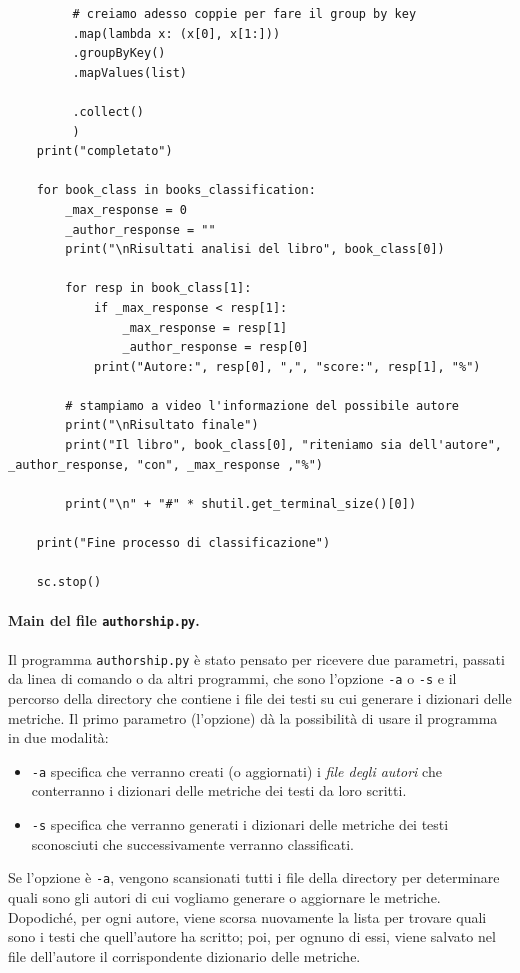 \documentclass[titlepage]{article}
\begin{document}
\begin{verbatim}
         # creiamo adesso coppie per fare il group by key
         .map(lambda x: (x[0], x[1:]))
         .groupByKey()
         .mapValues(list)
         
         .collect()
         )
    print("completato")

    for book_class in books_classification:
        _max_response = 0
        _author_response = ""
        print("\nRisultati analisi del libro", book_class[0])
        
        for resp in book_class[1]:
            if _max_response < resp[1]:
                _max_response = resp[1]
                _author_response = resp[0]
            print("Autore:", resp[0], ",", "score:", resp[1], "%")
        
        # stampiamo a video l'informazione del possibile autore
        print("\nRisultato finale")
        print("Il libro", book_class[0], "riteniamo sia dell'autore", _author_response, "con", _max_response ,"%")
        
        print("\n" + "#" * shutil.get_terminal_size()[0])
    
    print("Fine processo di classificazione")

    sc.stop()

\end{verbatim}

\paragraph{Main del file \texttt{authorship.py}.}
Il programma \texttt{authorship.py} è stato pensato per ricevere due parametri, passati da linea di comando o da altri programmi, che sono l'opzione \texttt{-a} o \texttt{-s} e il percorso della directory che contiene i file dei testi su cui generare i dizionari delle metriche. Il primo parametro (l'opzione) dà la possibilità di usare il programma in due modalità:
\begin{itemize}
    \item \texttt{-a} specifica che verranno creati (o aggiornati) i \textit{file degli autori} che conterranno i dizionari delle metriche dei testi da loro scritti.
    
    \item \texttt{-s} specifica che verranno generati i dizionari delle metriche dei testi sconosciuti che successivamente verranno classificati.
    
\end{itemize}

Se l'opzione è \texttt{-a}, vengono scansionati tutti i file della directory per determinare quali sono gli autori di cui vogliamo generare o aggiornare le metriche. Dopodiché, per ogni autore, viene scorsa nuovamente la lista per trovare quali sono i testi che quell'autore ha scritto; poi, per ognuno di essi, viene salvato nel file dell'autore il corrispondente dizionario delle metriche.
\end{document}
